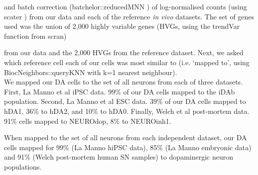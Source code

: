 and batch correction (batchelor::reducedMNN \cite{haghverdi2018batch}) of log-normalised counts (using scater \cite{mccarthy2017scater}) from our data and each of the reference \textit{in vivo} datasets. 
The set of genes used was the union of 2,000 highly variable genes (HVGs, using the trendVar function from scran) 

from our data and the 2,000 HVGs from the reference dataset. 
Next, we asked which reference cell each of our cells was most similar to (i.e. ‘mapped to', using BiocNeighbors::queryKNN with k=1 nearest neighbour).\\

We mapped our DA cells to the set of all neurons from each of three datasets.
First, La Manno et al iPSC data. 99\% of our DA cells mapped to the iDAb population.
Second, La Manno et al ESC data. 39\% of our DA cells mapped to hDA1, 36\% to hDA2, and 10\% to hDA0.
Finally, Welch et al post-mortem data. 91\% cells mapped to NEUROdop, 8\% to NEUROinh1.


When mapped to the set of all neurons from each independent dataset, our DA cells mapped for 99\% (La Manno hiPSC data), 85\% (La Manno embryonic data) and 91\% (Welch post-mortem human SN samples) to dopaminergic neuron populations.\\











